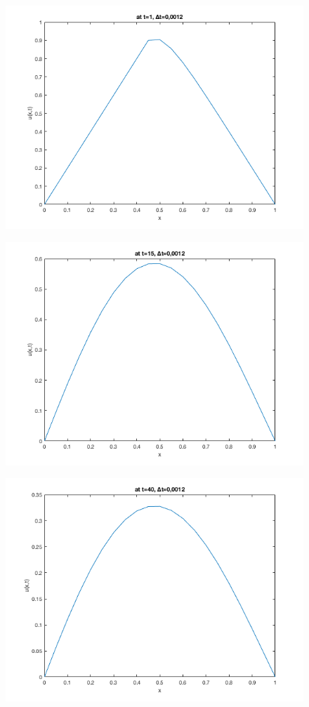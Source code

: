 \documentclass[paper=a4, fontsize=11pt]{scrartcl} %
\numberwithin{equation}{section} %
\numberwithin{figure}{section} %
\numberwithin{table}{section} %
\begin{document}
\begin{figure}[h]
\centering
\includegraphics[scale=0.5]{graph1}
\end{figure}
\begin{figure}[h]
\centering
\includegraphics[scale=0.5]{graph2}
\end{figure}
\begin{figure}[h]
\centering
\includegraphics[scale=0.6]{graph3}
\end{figure}
\end{document}
